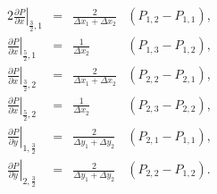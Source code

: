 \documentclass{article}
\begin{document}
\begin{alignat*}{2}
	\left.\frac{\partial P}{\partial x}\right|_{\frac{3}{2},1} &=&	\frac{2}{{\Delta x_1 + \Delta x_2}}&\left(P_{1,2}-P_{1,1}\right),\\
	\left.\frac{\partial P}{\partial x}\right|_{\frac{5}{2},1} &=&	\frac{1}{{\Delta x_2}}&\left( P_{1,3}-P_{1,2}\right),\\
	\left.\frac{\partial P}{\partial x}\right|_{\frac{3}{2},2} &=&	\frac{2}{{\Delta x_1 + \Delta x_2}}&\left( P_{2,2}-P_{2,1} \right),\\
	\left.\frac{\partial P}{\partial x}\right|_{\frac{5}{2},2} &=&	\frac{1}{{\Delta x_2}}&\left( P_{2,3}-P_{2,2} \right),\\
	\left.\frac{\partial P}{\partial y}\right|_{1,\frac{3}{2}} &=&	\frac{2}{{\Delta y_1 + \Delta y_2}}&\left(P_{2,1}-P_{1,1} \right),\\
	\left.\frac{\partial P}{\partial y}\right|_{2,\frac{3}{2}} &=&	\frac{2}{{\Delta y_1 + \Delta y_2}}&\left( P_{2,2}-P_{1,2} \right).
\end{alignat*}
\end{document}

